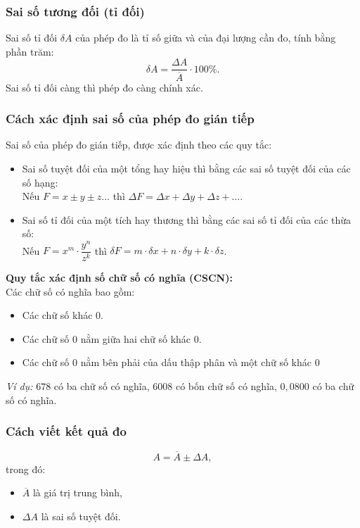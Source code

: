 \subsubsection{Sai số tương đối (tỉ đối)}
Sai số tỉ đối $\delta A$ của phép đo là tỉ số giữa  và  của đại lượng cần đo, tính bằng phần trăm:
$$\delta A=\dfrac{\Delta A}{\overline A}\cdot 100\%.$$
Sai số tỉ đối càng  thì phép đo càng chính xác.

\subsubsection{Cách xác định sai số của phép đo gián tiếp}
Sai số của phép đo gián tiếp, được xác định theo các quy tắc:
\begin{itemize}
	\item Sai số tuyệt đối của một tổng hay hiệu thì bằng  các sai số tuyệt đối của các số hạng:\\
	Nếu $F=x\pm y\pm z \dots$ thì $\Delta F = \Delta x + \Delta y + \Delta z+\dots$.
	\item Sai số tỉ đối của một tích hay thương thì bằng  các sai số tỉ đối của các thừa số:\\ 
	Nếu $F= x^m\cdot\dfrac{y^n}{z^k}$ thì $\delta F=m\cdot\delta x+n\cdot\delta y +k\cdot\delta z$.
\end{itemize}
\textbf{Quy tắc xác định số chữ số có nghĩa (CSCN):}\\
Các chữ số có nghĩa bao gồm:
\begin{itemize}
	\item Các chữ số khác 0.
	\item Các chữ số 0 nằm giữa hai chữ số khác 0.
	\item Các chữ số 0 nằm bên phải của dấu	thập phân và một chữ số khác 0
\end{itemize}
\textit{Ví dụ:} $678$ có ba chữ số có nghĩa, $6008$ có bốn chữ số có nghĩa, $0,0800$ có ba chữ số có nghĩa.
\subsubsection{Cách viết kết quả đo}
$$A=\overline{A} \pm \Delta A,$$
trong đó:
\begin{itemize}
	\item $\overline A$ là giá trị trung bình,
	\item $\Delta A$ là sai số tuyệt đối. 
\end{itemize}
